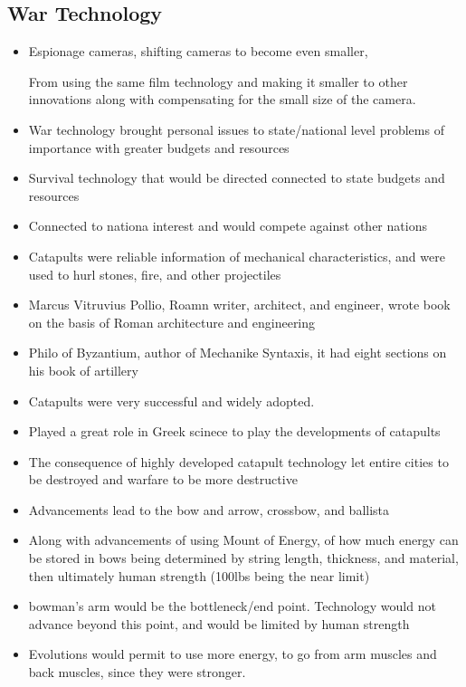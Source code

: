 \documentclass{article}
\begin{document}
\subsection{War Technology}
\begin{itemize}
  \item Espionage cameras, shifting cameras to become even smaller,

    From using the same film technology and making it smaller to other innovations
    along with compensating for the small size of the camera.
  \item War technology brought personal issues to state/national level problems
    of importance with greater budgets and resources
  \item Survival technology that would be directed connected to state budgets and resources
  \item Connected to nationa interest and would compete against other nations
  \item Catapults were reliable information of mechanical characteristics,
    and were used to hurl stones, fire, and other projectiles
  \item Marcus Vitruvius Pollio, Roamn writer, architect, and engineer,
    wrote book on the basis of Roman architecture and engineering
  \item Philo of Byzantium, author of Mechanike Syntaxis,
    it had eight sections on his book of artillery
  \item Catapults were very successful and widely adopted.
  \item Played a great role in Greek scinece to play the developments of catapults
  \item The consequence of highly developed catapult technology
    let entire cities to be destroyed and warfare to be more destructive
  \item Advancements lead to the bow and arrow, crossbow, and ballista
  \item Along with advancements of using Mount of Energy, of how much energy can be stored in bows
    being determined by string length, thickness, and material, then ultimately
    human strength (100lbs being the near limit)
  \item bowman's arm would be the bottleneck/end point. Technology would not advance
    beyond this point, and would be limited by human strength
  \item Evolutions would permit to use more energy, to
    go from arm muscles and back muscles, since they were stronger.
\end{itemize}
\end{document}
